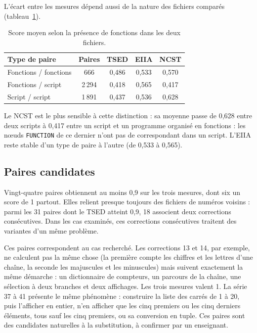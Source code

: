 \documentclass[12pt,a4paper,oneside]{report}
\begin{document}
L'écart entre les mesures dépend aussi de la nature des fichiers comparés
(tableau~\ref{tab:types_corpus}).

\begin{table}[htbp]
\centering
\small
\renewcommand{\arraystretch}{1.15}
\begin{tabular}{lcccc}
\toprule
\textbf{Type de paire} & \textbf{Paires} &
\textcolor{tsedcol}{\textbf{TSED}} & \textcolor{eiiacol}{\textbf{EIIA}} &
\textcolor{ncstcol}{\textbf{NCST}} \\
\midrule
Fonctions / fonctions & 666   & 0,486 & 0,533 & 0,570 \\
Fonctions / script    & 2\,294 & 0,418 & 0,565 & 0,417 \\
Script / script       & 1\,891 & 0,437 & 0,536 & 0,628 \\
\bottomrule
\end{tabular}
\caption{Score moyen selon la présence de fonctions dans les deux fichiers.}
\label{tab:types_corpus}
\end{table}

Le NCST est le plus sensible à cette distinction : sa moyenne passe de 0,628
entre deux scripts à 0,417 entre un script et un programme organisé en
fonctions : les nœuds \texttt{FUNCTION} de ce dernier n'ont pas de
correspondant dans un script. L'EIIA reste stable d'un type de paire à
l'autre (de 0,533 à 0,565).

\subsection{Paires candidates}

Vingt-quatre paires obtiennent au moins 0,9 sur les trois mesures, dont six
un score de 1 partout. Elles relient presque toujours des fichiers de numéros
voisins : parmi les 31 paires dont le TSED atteint 0,9, 18 associent deux
corrections consécutives. Dans les cas examinés, ces corrections
consécutives traitent des variantes d'un même problème.

Ces paires correspondent au cas recherché. Les corrections 13 et 14, par
exemple, ne calculent pas la même chose (la première compte les chiffres et
les lettres d'une chaîne, la seconde les majuscules et les minuscules) mais
suivent exactement la même démarche : un dictionnaire de compteurs, un parcours de
la chaîne, une sélection à deux branches et deux affichages. Les trois mesures
valent 1. La série 37 à 41 présente le même phénomène : construire la liste
des carrés de 1 à 20, puis l'afficher en entier, n'en afficher que les cinq
premiers ou les cinq derniers éléments, tous sauf les cinq premiers, ou sa
conversion en tuple. Ces paires sont des candidates naturelles
à la substitution, à confirmer par un enseignant.
\end{document}
